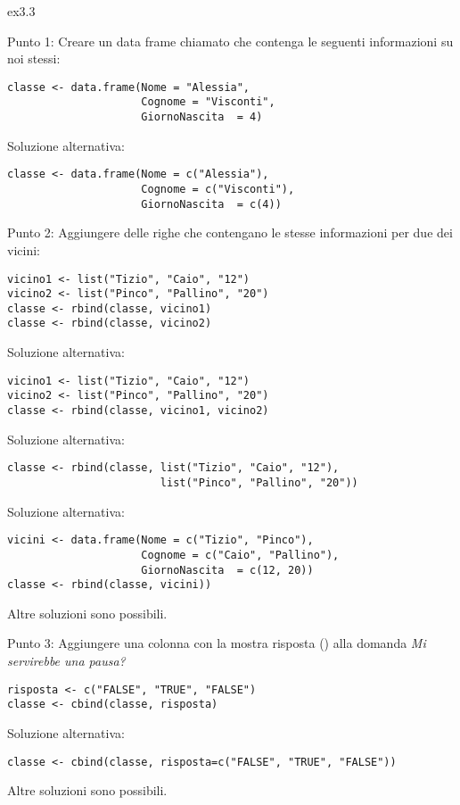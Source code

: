 \vspace{0.5cm}

\begin{solution}{ex3.3}

\noindent Punto 1: Creare un data frame chiamato  che contenga le seguenti informazioni su noi stessi: 

\begin{lstlisting}[style=Rstyle]
classe <- data.frame(Nome = "Alessia",
                     Cognome = "Visconti",
                     GiornoNascita  = 4)
\end{lstlisting}
%
Soluzione alternativa:

\begin{lstlisting}[style=Rstyle]
classe <- data.frame(Nome = c("Alessia"),
                     Cognome = c("Visconti"),
                     GiornoNascita  = c(4))
\end{lstlisting}

\vspace{0.2cm}
\noindent Punto 2: Aggiungere delle righe che contengano le stesse informazioni per due dei vicini:

\begin{lstlisting}[style=Rstyle]
vicino1 <- list("Tizio", "Caio", "12")
vicino2 <- list("Pinco", "Pallino", "20")
classe <- rbind(classe, vicino1)
classe <- rbind(classe, vicino2)
\end{lstlisting}
%
Soluzione alternativa:

\begin{lstlisting}[style=Rstyle]
vicino1 <- list("Tizio", "Caio", "12")
vicino2 <- list("Pinco", "Pallino", "20")
classe <- rbind(classe, vicino1, vicino2)
\end{lstlisting}
%
Soluzione alternativa:

\begin{lstlisting}[style=Rstyle]
classe <- rbind(classe, list("Tizio", "Caio", "12"),
                        list("Pinco", "Pallino", "20"))
\end{lstlisting}
%
Soluzione alternativa:

\begin{lstlisting}[style=Rstyle]
vicini <- data.frame(Nome = c("Tizio", "Pinco"),
                     Cognome = c("Caio", "Pallino"),
                     GiornoNascita  = c(12, 20))
classe <- rbind(classe, vicini))
\end{lstlisting}
%
Altre soluzioni sono possibili.

\vspace{0.2cm}
\noindent Punto 3:  Aggiungere una colonna con la mostra risposta () alla domanda \emph{Mi servirebbe una pausa?}

\begin{lstlisting}[style=Rstyle]
risposta <- c("FALSE", "TRUE", "FALSE")
classe <- cbind(classe, risposta)
\end{lstlisting}
%
Soluzione alternativa:
\begin{lstlisting}[style=Rstyle]
classe <- cbind(classe, risposta=c("FALSE", "TRUE", "FALSE"))
\end{lstlisting}
%
Altre soluzioni sono possibili.

\end{solution}

